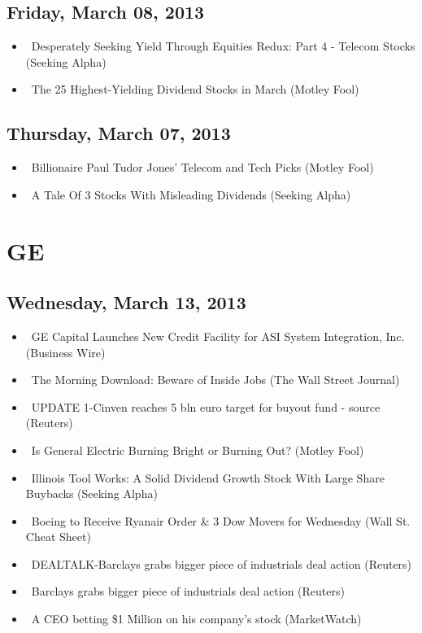 \documentclass[11pt,asymmetric]{article}
\begin{document}
\subsection*{Friday, March 08, 2013}
\begin{itemize}
\item\ Desperately Seeking Yield Through Equities Redux: Part 4 - Telecom Stocks (Seeking Alpha)
\item\ The 25 Highest-Yielding Dividend Stocks in March (Motley Fool)
\end{itemize}
\subsection*{Thursday, March 07, 2013}
\begin{itemize}
\item\ Billionaire Paul Tudor Jones’ Telecom and Tech Picks (Motley Fool)
\item\ A Tale Of 3 Stocks With Misleading Dividends (Seeking Alpha)
\end{itemize}

\section*{GE}

\subsection*{Wednesday, March 13, 2013}
\begin{itemize}
\item\ GE Capital Launches New Credit Facility for ASI System Integration, Inc. (Business Wire)
\item\ The Morning Download: Beware of Inside Jobs (The Wall Street Journal)
\item\ UPDATE 1-Cinven reaches 5 bln euro target for buyout fund - source (Reuters)
\item\ Is General Electric Burning Bright or Burning Out? (Motley Fool)
\item\ Illinois Tool Works: A Solid Dividend Growth Stock With Large Share Buybacks (Seeking Alpha)
\item\ Boeing to Receive Ryanair Order \& 3 Dow Movers for Wednesday (Wall St. Cheat Sheet)
\item\ DEALTALK-Barclays grabs bigger piece of industrials deal action (Reuters)
\item\ Barclays grabs bigger piece of industrials deal action (Reuters)
\item\ A CEO betting \$1 Million on his company's stock (MarketWatch)
\end{itemize}
\end{document}
